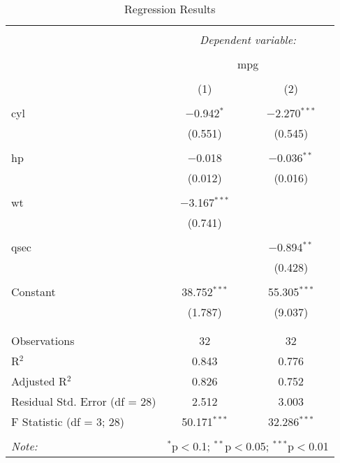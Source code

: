
\begin{table}[!htbp] \centering 
  \caption{Regression Results} 
  \label{} 
\begin{tabular}{@{\extracolsep{5pt}}lcc} 
\\[-1.8ex]\hline 
\hline \\[-1.8ex] 
 & \multicolumn{2}{c}{\textit{Dependent variable:}} \\ 
\cline{2-3} 
\\[-1.8ex] & \multicolumn{2}{c}{mpg} \\ 
\\[-1.8ex] & (1) & (2)\\ 
\hline \\[-1.8ex] 
 cyl & $-$0.942$^{*}$ & $-$2.270$^{***}$ \\ 
  & (0.551) & (0.545) \\ 
  & & \\ 
 hp & $-$0.018 & $-$0.036$^{**}$ \\ 
  & (0.012) & (0.016) \\ 
  & & \\ 
 wt & $-$3.167$^{***}$ &  \\ 
  & (0.741) &  \\ 
  & & \\ 
 qsec &  & $-$0.894$^{**}$ \\ 
  &  & (0.428) \\ 
  & & \\ 
 Constant & 38.752$^{***}$ & 55.305$^{***}$ \\ 
  & (1.787) & (9.037) \\ 
  & & \\ 
\hline \\[-1.8ex] 
Observations & 32 & 32 \\ 
R$^{2}$ & 0.843 & 0.776 \\ 
Adjusted R$^{2}$ & 0.826 & 0.752 \\ 
Residual Std. Error (df = 28) & 2.512 & 3.003 \\ 
F Statistic (df = 3; 28) & 50.171$^{***}$ & 32.286$^{***}$ \\ 
\hline 
\hline \\[-1.8ex] 
\textit{Note:}  & \multicolumn{2}{r}{$^{*}$p$<$0.1; $^{**}$p$<$0.05; $^{***}$p$<$0.01} \\ 
\end{tabular} 
\end{table} 
